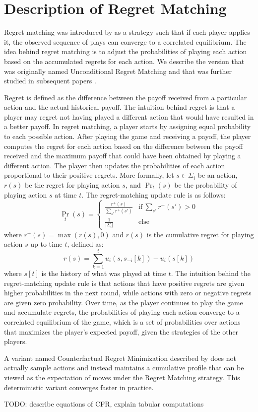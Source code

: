 \section{Description of Regret Matching}
\label{sec:regret}

Regret matching was introduced by \citet{Hart1997-nk} as a strategy such that if each player applies it, the observed sequence of plays can converge to a correlated equilibrium. The idea behind regret matching is to adjust the probabilities of playing each action based on the accumulated regrets for each action. We describe the version that was originally named Unconditional Regret Matching and that was further studied in subsequent papers \citep{hart2001reinforcement, hart2001reinforcementcorrection}.

Regret is defined as the difference between the payoff received from a particular action and the actual historical payoff. The intuition behind regret is that a player may regret not having played a different action that would have resulted in a better payoff.
In regret matching, a player starts by assigning equal probability to each possible action. After playing the game and receiving a payoff, the player computes the regret for each action based on the difference between the payoff received and the maximum payoff that could have been obtained by playing a different action. The player then updates the probabilities of each action proportional to their positive regrets.
More formally, let $s \in \Sigma_i$ be an action, $r(s)$ be the regret for playing action $s$, and $\Pr_t(s)$ be the probability of playing action $s$ at time $t$. The regret-matching update rule is as follows:
$${\Pr}_{t}(s) = \begin{cases} \frac{r^+(s)}{\sum_{s'} r^+(s')} &\text{if}~\sum_{s'} r^+(s') > 0\\
\frac{1}{|\Sigma_i|} &\text{else} \end{cases}$$
where $r^+(s) =\max(r(s), 0)$ and $r(s)$ is the cumulative regret for playing action $s$ up to time $t$, defined as:
$$r(s) = \sum_{k=1}^t u_i(s, s_{-i}[k]) - u_i(s[k])$$
where $s[t]$ is the history of what was played at time $t$.
The intuition behind the regret-matching update rule is that actions that have positive regrets are given higher probabilities in the next round, while actions with zero or negative regrets are given zero probability. Over time, as the player continues to play the game and accumulate regrets, the probabilities of playing each action converge to a correlated equilibrium of the game, which is a set of probabilities over actions that maximizes the player's expected payoff, given the strategies of the other players.

A variant named Counterfactual Regret Minimization described by \cite{neller2013introduction} does not actually sample actions and instead maintains a cumulative profile that can be viewed as the expectation of moves under the Regret Matching strategy. This deterministic variant converges faster in practice.

TODO: describe equations of CFR, explain tabular computations